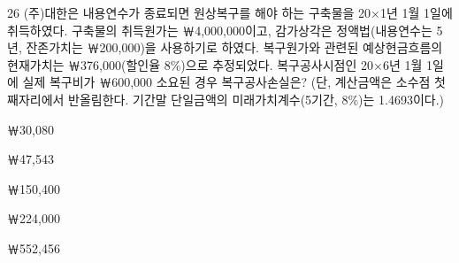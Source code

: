 \begin{question}{26}
(주)대한은 내용연수가 종료되면 원상복구를 해야 하는 구축물을 20×1년 1월 1일에 취득하였다. 구축물의 취득원가는 ￦4,000,000이고, 감가상각은 정액법(내용연수는 5년, 잔존가치는 ￦200,000)을 사용하기로 하였다. 복구원가와 관련된 예상현금흐름의 현재가치는 ￦376,000(할인율 8\%)으로 추정되었다. 복구공사시점인 20×6년 1월 1일에 실제 복구비가 ￦600,000 소요된 경우 복구공사손실은?
(단, 계산금액은 소수점 첫째자리에서 반올림한다. 기간말 단일금액의 미래가치계수(5기간, 8\%)는 1.4693이다.) \par
\begin{choices}
  \item ￦30,080
  \item ￦47,543
  \item ￦150,400
  \item ￦224,000
  \item ￦552,456
\end{choices}
\end{question}
